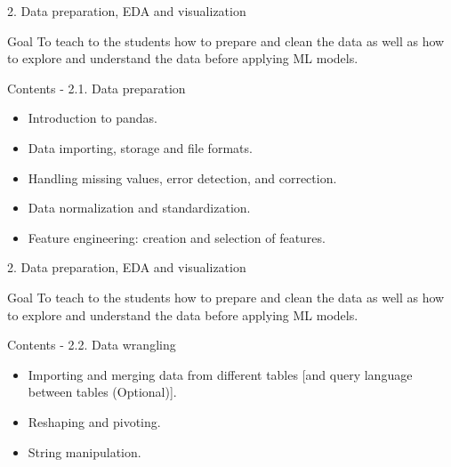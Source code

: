 \documentclass[
  ignorenonframetext,
]{beamer}
\providecommand{\tightlist}{%
  \setlength{\itemsep}{0pt}\setlength{\parskip}{0pt}}\usepackage{longtable,booktabs,array}
\begin{document}
\begin{frame}{2. Data preparation, EDA and visualization}
\protect\hypertarget{data-preparation-eda-and-visualization}{}
\begin{alertblock}{Goal}
\protect\hypertarget{goal-4}{}
To teach to the students how to prepare and clean the data as well as
how to explore and understand the data before applying ML models.\pause
\end{alertblock}

\begin{exampleblock}{Contents - 2.1. Data preparation}
\protect\hypertarget{contents---2.1.-data-preparation}{}
\begin{itemize}
\tightlist
\item
  Introduction to pandas.
\item
  Data importing, storage and file formats.
\item
  Handling missing values, error detection, and correction.
\item
  Data normalization and standardization.
\item
  Feature engineering: creation and selection of features.
\end{itemize}
\end{exampleblock}
\end{frame}

\begin{frame}{2. Data preparation, EDA and visualization}
\protect\hypertarget{data-preparation-eda-and-visualization-1}{}
\begin{alertblock}{Goal}
\protect\hypertarget{goal-5}{}
To teach to the students how to prepare and clean the data as well as
how to explore and understand the data before applying ML models.
\end{alertblock}

\begin{exampleblock}{Contents - 2.2. Data wrangling}
\protect\hypertarget{contents---2.2.-data-wrangling}{}
\begin{itemize}
\tightlist
\item
  Importing and merging data from different tables {[}and query language
  between tables (Optional){]}.
\item
  Reshaping and pivoting.
\item
  String manipulation.
\end{itemize}
\end{exampleblock}
\end{frame}
\end{document}

